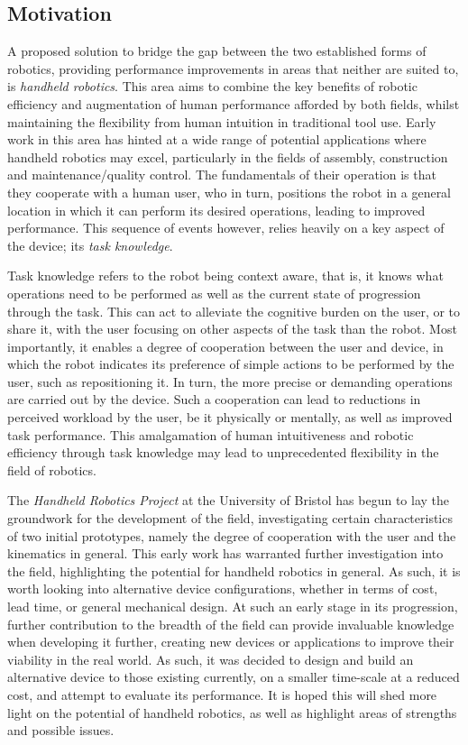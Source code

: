 \documentclass[11pt]{article}
\begin{document}
\subsection{Motivation}
A proposed solution to bridge the gap between the two established forms of robotics, providing performance improvements in areas that neither are suited to, is \textit{handheld robotics}. This area aims to combine the key benefits of robotic efficiency and augmentation of human performance afforded by both fields, whilst maintaining the flexibility from human intuition in traditional tool use. Early work in this area has hinted at a wide range of potential applications where handheld robotics may excel, particularly in the fields of assembly, construction and maintenance/quality control. The fundamentals of their operation is that they cooperate with a human user, who in turn, positions the robot in a general location in which it can perform its desired operations, leading to improved performance. This sequence of events however, relies heavily on a key aspect of the device; its \textit{task knowledge}. 

Task knowledge refers to the robot being context aware, that is, it knows what operations need to be performed as well as the current state of progression through the task. This can act to alleviate the cognitive burden on the user, or to share it, with the user focusing on other aspects of the task than the robot. Most importantly, it enables a degree of cooperation between the user and device, in which the robot indicates its preference of simple actions to be performed by the user, such as repositioning it. In turn, the more precise or demanding operations are carried out by the device. Such a cooperation can lead to reductions in perceived workload by the user, be it physically or mentally, as well as improved task performance. This amalgamation of human intuitiveness and robotic efficiency through task knowledge may lead to unprecedented flexibility in the field of robotics.

The \textit{Handheld Robotics Project} at the University of Bristol has begun to lay the groundwork for the development of the field, investigating certain characteristics of two initial prototypes, namely the degree of cooperation with the user and the kinematics in general. This early work has warranted further investigation into the field, highlighting the potential for handheld robotics in general. As such, it is worth looking into alternative device configurations, whether in terms of cost, lead time, or general mechanical design. At such an early stage in its progression, further contribution to the breadth of the field can provide invaluable knowledge when developing it further, creating new devices or applications to improve their viability in the real world. As such, it was decided to design and build an alternative device to those existing currently, on a smaller time-scale at a reduced cost, and attempt to evaluate its performance. It is hoped this will shed more light on the potential of handheld robotics, as well as highlight areas of strengths and possible issues.
\end{document}
